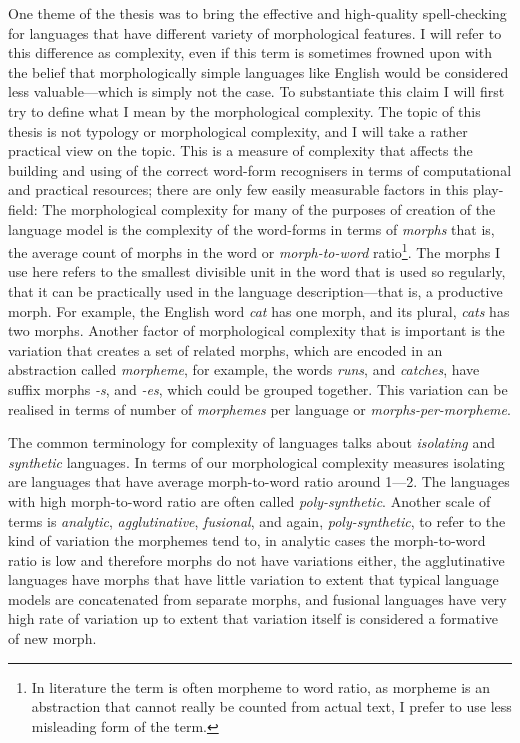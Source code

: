 \documentclass[officiallayout]{unihelcompling}
\begin{document}
One theme of the thesis was to bring the effective and high-quality
spell-checking for languages that have different variety of morphological
features. I will refer to this difference as complexity, even if this term is
sometimes frowned upon with the belief that morphologically simple languages
like English would be considered less valuable---which is simply not the case.
To substantiate this claim I will first try to define what I mean by the
morphological complexity. The topic of this thesis is not typology or
morphological complexity, and I will take a rather practical view on the topic.
This is a measure of complexity that affects the building and using of the
correct word-form recognisers in terms of computational and practical
resources; there are only few easily measurable factors in this play-field: The
morphological complexity for many of the purposes of creation of the language
model is the complexity of the word-forms in terms of \emph{morphs} that is,
the average count of morphs in the word or \emph{morph-to-word}
ratio\footnote{In literature the term is often morpheme to word ratio, as
    morpheme is an abstraction that cannot really be counted from actual text,
I prefer to use less misleading form of the term.}. The morphs I use here
refers to the smallest divisible unit in the word that is used so regularly,
that it can be practically used in the language description---that is, a
productive morph. For example, the English word \emph{cat} has one morph, and
its plural, \emph{cats} has two morphs.  Another factor of morphological
complexity that is important is the variation that creates a set of related
morphs, which are encoded in an abstraction called \emph{morpheme}, for
example, the words \emph{runs}, and \emph{catches}, have suffix morphs
\emph{-s}, and \emph{-es}, which could be grouped together. This variation can
be realised in terms of number of \emph{morphemes} per language or
\emph{morphs-per-morpheme}.

The common terminology for complexity of languages talks about \emph{isolating}
and \emph{synthetic} languages. In terms of our morphological complexity
measures isolating are languages that have average morph-to-word ratio around
1---2. The languages with high morph-to-word ratio are often called
\emph{poly-synthetic}. Another scale of terms is \emph{analytic},
\emph{agglutinative}, \emph{fusional}, and again, \emph{poly-synthetic}, to
refer to the kind of variation the morphemes tend to, in analytic cases the
morph-to-word ratio is low and therefore morphs do not have variations either,
the agglutinative languages have morphs that have little variation to extent
that typical language models are concatenated from separate morphs, and
fusional languages have very high rate of variation up to extent that variation
itself is considered a formative of new morph. 
\end{document}
